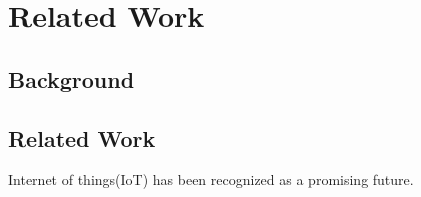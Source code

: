 \chapter{Related Work}
\label{c:related_work}

\section{Background} 
\section{Related Work} 


Internet of things(IoT) has been recognized as a promising future. 



